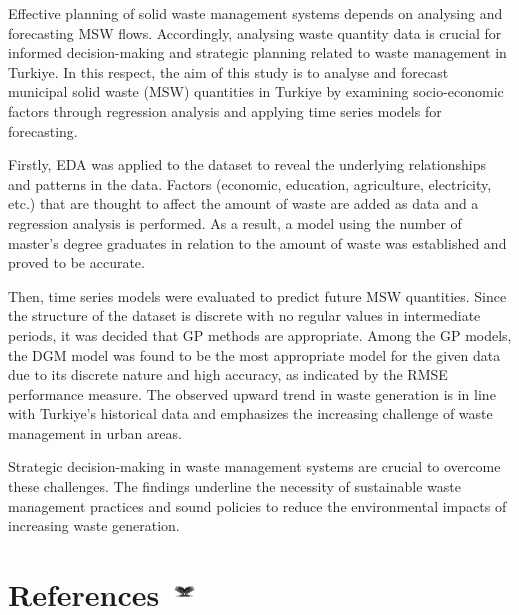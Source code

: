 \documentclass[
  11pt,
  a4paper,
  DIV=11,
  numbers=noendperiod]{scrartcl}
\begin{document}
Effective planning of solid waste management systems depends on
analysing and forecasting MSW flows. Accordingly, analysing waste
quantity data is crucial for informed decision-making and strategic
planning related to waste management in Turkiye. In this respect, the
aim of this study is to analyse and forecast municipal solid waste (MSW)
quantities in Turkiye by examining socio-economic factors through
regression analysis and applying time series models for forecasting.

Firstly, EDA was applied to the dataset to reveal the underlying
relationships and patterns in the data. Factors (economic, education,
agriculture, electricity, etc.) that are thought to affect the amount of
waste are added as data and a regression analysis is performed. As a
result, a model using the number of master's degree graduates in
relation to the amount of waste was established and proved to be
accurate.

Then, time series models were evaluated to predict future MSW
quantities. Since the structure of the dataset is discrete with no
regular values in intermediate periods, it was decided that GP methods
are appropriate. Among the GP models, the DGM model was found to be the
most appropriate model for the given data due to its discrete nature and
high accuracy, as indicated by the RMSE performance measure. The
observed upward trend in waste generation is in line with Turkiye's
historical data and emphasizes the increasing challenge of waste
management in urban areas.

Strategic decision-making in waste management systems are crucial to
overcome these challenges. The findings underline the necessity of
sustainable waste management practices and sound policies to reduce the
environmental impacts of increasing waste generation.

\section[{References} ]{\texorpdfstring{{References}
\protect\includegraphics[width=0.3125in,height=0.30208in]{assets/images/references.jpg}}{References }}\label{references}
\end{document}
